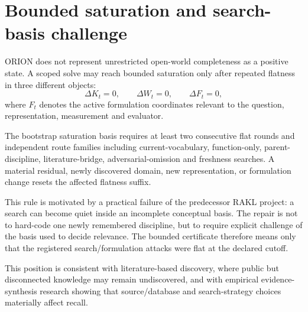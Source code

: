 \section{Bounded saturation and search-basis challenge}

ORION does not represent unrestricted open-world completeness as a positive state. A scoped solve may reach bounded saturation only after repeated flatness in three different objects:
\[
\Delta K_t=0,\qquad \Delta W_t=0,\qquad \Delta F_t=0,
\]
where $F_t$ denotes the active formulation coordinates relevant to the question, representation, measurement and evaluator.

The bootstrap saturation basis requires at least two consecutive flat rounds and independent route families including current-vocabulary, function-only, parent-discipline, literature-bridge, adversarial-omission and freshness searches. A material residual, newly discovered domain, new representation, or formulation change resets the affected flatness suffix.

This rule is motivated by a practical failure of the predecessor RAKL project: a search can become quiet inside an incomplete conceptual basis. The repair is not to hard-code one newly remembered discipline, but to require explicit challenge of the basis used to decide relevance. The bounded certificate therefore means only that the registered search/formulation attacks were flat at the declared cutoff.

This position is consistent with literature-based discovery, where public but disconnected knowledge may remain undiscovered, and with empirical evidence-synthesis research showing that source/database and search-strategy choices materially affect recall.
